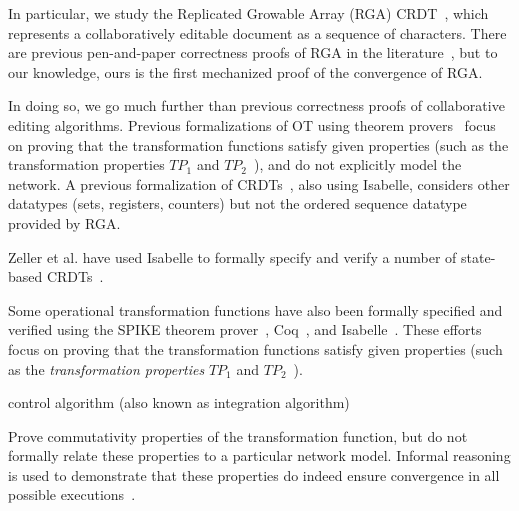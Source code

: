 In particular, we study the Replicated Growable Array (RGA) CRDT~\cite{Roh:2011dw}, which represents
a collaboratively editable document as a sequence of characters. There are previous pen-and-paper
correctness proofs of RGA in the literature~\cite{Attiya:2016kh,Kleppmann:2016ve,Roh:2009ws}, but to
our knowledge, ours is the first mechanized proof of the convergence of RGA.

In doing so, we go much further than previous correctness proofs of collaborative editing
algorithms. Previous formalizations of OT using theorem
provers~\cite{Imine:2003ks,Imine:2006kn,Sinchuk:2016cf,Jungnickel:2015ua} focus on proving that the
transformation functions satisfy given properties (such as the transformation properties
$\mathit{TP}_1$ and $\mathit{TP}_2$~\cite{Oster:2006tr,Ressel:1996wx}), and do not explicitly model
the network. A previous formalization of CRDTs~\cite{Zeller:2014fl}, also using Isabelle, considers
other datatypes (sets, registers, counters) but not the ordered sequence datatype provided by RGA.



Zeller et al. have used Isabelle to formally specify and verify a number of state-based CRDTs~\cite{Zeller:2014fl}.

Some operational transformation functions have also been formally specified and verified using the
SPIKE theorem prover~\cite{Imine:2003ks,Imine:2006kn}, Coq~\cite{Sinchuk:2016cf}, and
Isabelle~\cite{Jungnickel:2015ua}. These efforts focus on proving that the transformation functions
satisfy given properties (such as the \emph{transformation properties} $\mathit{TP}_1$ and
$\mathit{TP}_2$~\cite{Oster:2006tr,Ressel:1996wx}).

control algorithm (also known as integration algorithm)

Prove commutativity properties of the transformation function, but do not formally relate these
properties to a particular network model. Informal reasoning is used to demonstrate that these
properties do indeed ensure convergence in all possible
executions~\cite{Suleiman:1998eu,Sun:1998vf}.



